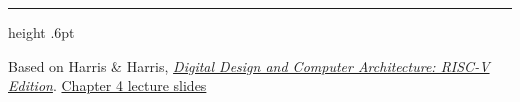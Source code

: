 \documentclass[10pt,letterpaper,landscape]{article}
\begin{document}
\vfill
{\color{teal}\hrule height .6pt}\vspace{4pt}
{\footnotesize Based on Harris \& Harris,
\href{https://pages.hmc.edu/harris/ddca/ddcarv.html}{\emph{Digital Design and Computer Architecture: RISC-V Edition}}.
\hfill\href{https://pages.hmc.edu/harris/class/e85/DDCArv_Ch4.pdf}{Chapter 4 lecture slides}}
\end{document}
